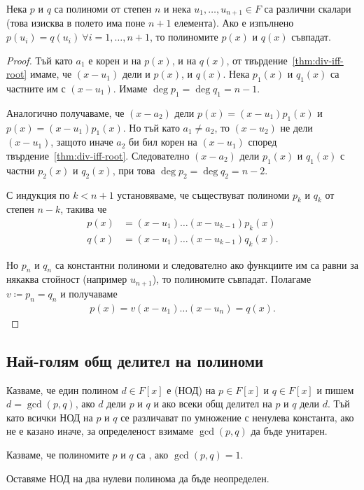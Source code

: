 \documentclass[numbers=endperiod, bibliography=totocnumbered]{scrartcl}
\begin{document}
\begin{theorem}\label{thm:coeff-principle}
  Нека \( p \) и \( q \) са полиноми от степен \( n \) и нека \( u_1, \ldots, u_{n+1} \in F \) са различни скалари (това изисква в полето има поне \( n+1 \) елемента). Ако е изпълнено \( p(u_i) = q(u_i)~\forall i = 1, \ldots, n + 1 \), то полиномите \( p(x) \) и \( q(x) \) съвпадат.
\end{theorem}
\begin{proof}
  Тъй като \( a_1 \) е корен и на \( p(x) \), и на \( q(x) \), от твърдение~\ref{thm:div-iff-root} имаме, че \( (x - u_1) \) дели и \( p(x) \), и \( q(x) \). Нека \( p_1(x) \) и \( q_1(x) \) са частните им с \( (x - u_1) \). Имаме \( \deg p_1 = \deg q_1 = n - 1 \).

  Аналогично получаваме, че \( (x - a_2) \) дели \( p(x) = (x - u_1) p_1(x) \) и \( p(x) = (x - u_1) p_1(x) \). Но тъй като \( a_1 \neq a_2 \), то \( (x - u_2) \) не дели \( (x - u_1) \), защото иначе \( a_2 \) би бил корен на \( (x - u_1) \) според твърдение~\ref{thm:div-iff-root}. Следователно \( (x - a_2) \) дели \( p_1(x) \) и \( q_1(x) \) с частни \( p_2(x) \) и \( q_2(x) \), при това \( \deg p_2 = \deg q_2 = n - 2 \).

  С индукция по \( k < n + 1 \) установяваме, че съществуват полиноми \( p_k \) и \( q_k \) от степен \( n - k \), такива че
  \begin{align*}
    p(x) &= (x - u_1) \ldots (x - u_{k-1}) p_k(x) \\
    q(x) &= (x - u_1) \ldots (x - u_{k-1}) q_k(x).
  \end{align*}

  Но \( p_n \) и \( q_n \) са константни полиноми и следователно ако функциите им са равни за някаква стойност (например \( u_{n+1} \)), то полиномите съвпадат. Полагаме \( v \coloneqq p_n = q_n \) и получаваме
  \begin{align*}
    p(x) = v (x - u_1) \ldots (x - u_n) = q(x).
  \end{align*}
\end{proof}

\subsection{Най-голям общ делител на полиноми}

\begin{definition}
  Казваме, че един полином \( d \in F[x] \) е  (НОД) на \( p \in F[x] \) и \( q \in F[x] \) и пишем \( d = \gcd(p, q) \), ако \( d \) дели \( p \) и \( q \) и ако всеки общ делител на \( p \) и \( q \) дели \( d \). Тъй като всички НОД на \( p \) и \( q \) се различават по умножение с ненулева константа, ако не е казано иначе, за определеност взимаме \( \gcd(p, q) \) да бъде унитарен.

  Казваме, че полиномите \( p \) и \( q \) са , ако \( \gcd(p, q) = 1 \).

  Оставяме НОД на два нулеви полинома да бъде неопределен.
\end{definition}
\end{document}
